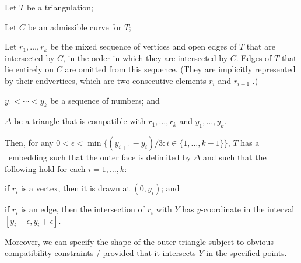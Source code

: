 \begin{thm}

	\begin{compactenum}
		\item Let $T$ be a triangulation;
		\item Let $C$ be an admissible curve for $T$;
\item Let $r_1,\ldots,r_k$ be the mixed sequence of vertices and open edges
  of $T$ that are intersected by $C$, in the order in
  which they are intersected by $C$. Edges of $T$ that
  lie entirely on $C$
are omitted from this sequence.
(They are implicitly represented by their endvertices, which are two consecutive elements $r_i$ and $r_{i+1}$ .)
		\item $y_1<\cdots<y_k$ be a sequence of numbers; and
		\item $\Delta$ be a triangle that is compatible with 
		$r_1,\ldots,r_k$ and $y_1,\ldots,y_k$.
	\end{compactenum}
	Then, for any $0<\epsilon<\min\{(y_{i+1}-y_i)/3:i\in\{1,\ldots,k-1\}\}$, $T$ has a \Fary\ embedding such that the outer face is delimited by $\Delta$ and such that the following hold for each $i=1,\ldots,k$: 
	\begin{compactenum}
		\item if $r_i$ is a vertex, then it is drawn at $(0,y_i)$; and
		\item if $r_i$ is an edge, then the intersection of $r_i$ with $Y$ has $y$-coordinate in the interval $[y_i-\epsilon,y_i+\epsilon]$.
\end{compactenum}

Moreover, we can specify the shape of the outer triangle
subject to
obvious compatibility constraints
/ provided that it intersects $Y$ in the specified points.
                
\end{thm}


